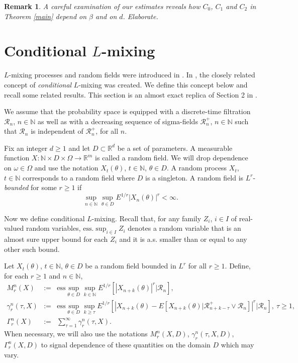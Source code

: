 \documentclass[a4paper,draft]{article}
\newtheorem{remark}[theorem]{Remark}
\begin{document}
\begin{remark}\label{betad} {\rm A careful examination of our estimates reveals how $C_0$, $C_1$
and $C_2$ in Theorem \ref{main} depend on $\beta$ and on $d$. Elaborate.}
\end{remark}


\section{Conditional $L$-mixing}\label{lm}

$L$-mixing processes and random fields
were introduced in \cite{laci1}. In
\cite{4}, the closely related concept of \emph{conditional} $L$-mixing
was created. We
define this concept below and recall some related results. 
This section is an almost
exact replica of Section 2 in \cite{convex}.

We assume that the probability space is equipped
with a discrete-time filtration $\mathcal{R}_n$, $n\in\mathbb{N}$ as well as with a decreasing sequence of sigma-fields $\mathcal{R}_n^+$, $n\in\mathbb{N}$ such that $\mathcal{R}_n$ is
independent of $\mathcal{R}_n^+$, for all $n$.

Fix an integer $d\geq 1$ and let $D\subset \mathbb{R}^d$ be a set of parameters. A measurable function
$X:\mathbb{N}\times D\times\Omega\to\mathbb{R}^m$ is called a random field. We will drop dependence on $\omega\in\Omega$ and
use the notation $X_t(\theta)$, $t\in\mathbb{N}$, $\theta\in D$. A random
process $X_t$, $t\in\mathbb{N}$ corresponds to a random field where $D$
is a singleton. A random field is $L^r$-\emph{bounded} for some $r\geq 1$
if
$$
\sup_{n\in\mathbb{N}}\sup_{\theta\in D} E^{1/r}|X_n(\theta)|^r<\infty.
$$

Now we define conditional $L$-mixing.
Recall that, for any family $Z_i$, $i\in I$ of real-valued random variables, $\mathrm{ess.}\sup_{i\in I} Z_i$
denotes a random variable that is an almost sure upper bound for each $Z_i$ and it is a.s.
smaller than or equal to any other such bound.


Let $X_t(\theta)$, $t\in\mathbb{N}$, $\theta\in D$ be a random field
bounded in $L^r$ for all $r\geq 1$.
Define, for each $r\geq 1$ and $n\in\mathbb{N}$,
\begin{eqnarray*}
	M^{n}_r(X) &:=& \mathrm{ess}\sup_{\theta\in D}\sup_{k \in\mathbb{N}}
	E^{1/r}[|X_{n+k}(\theta)|^r\big\vert\mathcal{R}_n],\\
	\gamma^{n}_r(\tau,X)&:=& \mathrm{ess}\sup_{\theta\in D}\sup_{k\geq\tau}
	E^{1/r}[|X_{n+k}(\theta)-E[X_{n+k}(\theta)\vert \mathcal{R}_{n+k-\tau}^+\vee \mathcal{R}_n]|^r\big\vert
	\mathcal{R}_n],\ \tau\geq 1,\\
	\Gamma^{n}_r(X) &:=&\sum_{\tau= 1}^{\infty}\gamma^{n}_r(\tau,X).
\end{eqnarray*}
When necessary, we will also use the notations $M^{n}_r(X,D)$,
$\gamma^{n}_r(\tau,X,D)$, $\Gamma^{n}_r(X,D)$ to signal dependence of
these quantities on the domain $D$ which may vary.
\end{document}

